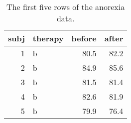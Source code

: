 \begin{table}[!h]

\caption{\label{tab:anorexia-data}The first five rows of the anorexia data.}
\centering
\begin{tabular}[t]{rlrr}
\toprule
subj & therapy & before & after\\
\midrule
1 & b & 80.5 & 82.2\\
2 & b & 84.9 & 85.6\\
3 & b & 81.5 & 81.4\\
4 & b & 82.6 & 81.9\\
5 & b & 79.9 & 76.4\\
\bottomrule
\end{tabular}
\end{table}
